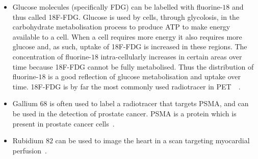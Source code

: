                 \begin{itemize}
                    \item Glucose molecules (specifically \gls{FDG}) can be labelled with fluorine-$18$ and thus called \gls{18F-FDG}. %
                    Glucose is used by cells, through glycolosis, in the carbohydrate metabolisation process to produce \gls{ATP} to make energy available to a cell. When a cell requires more energy it also requires more glucose and, as such, uptake of \gls{18F-FDG} is increased in these regions. The concentration of fluorine-$18$ intra-cellularly increases in certain areas over time because \gls{18F-FDG} cannot be fully metabolised. Thus the distribution of fluorine-$18$ is a good reflection of glucose metabolisation and uptake over time. \gls{18F-FDG} is by far the most commonly used radiotracer in \gls{PET}~~.
                    
                    \item Gallium $68$ is often used to label a radiotracer that targets \gls{PSMA}, and can be used in the detection of prostate cancer. \gls{PSMA} is a protein which is present in prostate cancer cells~.
                    
                    \item Rubidium $82$ can be used to image the heart in a scan targeting myocardial perfusion~.
                \end{itemize}
            
